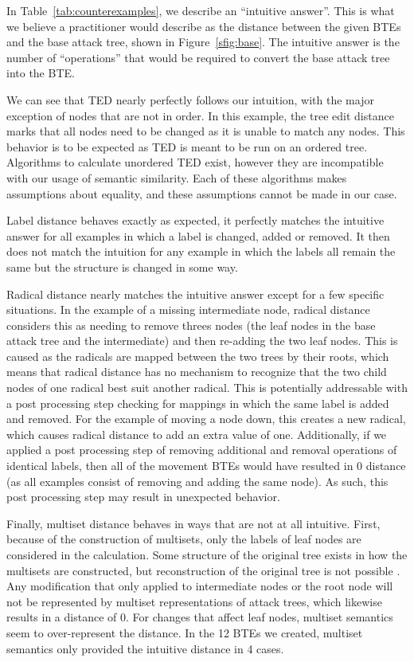 In Table~\ref{tab:counterexamples}, we describe an ``intuitive answer''. This is what we believe a practitioner would describe as the distance between the given BTEs and the base attack tree, shown in Figure~\ref{sfig:base}. The intuitive answer is the number of ``operations'' that would be required to convert the base attack tree into the BTE.

We can see that TED nearly perfectly follows our intuition, with the major exception of nodes that are not in order. In this example, the tree edit distance marks that all nodes need to be changed as it is unable to match any nodes. This behavior is to be expected as TED is meant to be run on an ordered tree. Algorithms to calculate unordered TED exist, however they are incompatible with our usage of semantic similarity. Each of these algorithms makes assumptions about equality, and these assumptions cannot be made in our case.

Label distance behaves exactly as expected, it perfectly matches the intuitive answer for all examples in which a label is changed, added or removed. It then does not match the intuition for any example in which the labels all remain the same but the structure is changed in some way.

Radical distance nearly matches the intuitive answer except for a few specific situations. In the example of a missing intermediate node, radical distance considers this as needing to remove threes nodes (the leaf nodes in the base attack tree and the intermediate) and then re-adding the two leaf nodes. This is caused as the radicals are mapped between the two trees by their roots, which means that radical distance has no mechanism to recognize that the two child nodes of one radical best suit another radical. This is potentially addressable with a post processing step checking for mappings in which the same label is added and removed. For the example of moving a node down, this creates a new radical, which causes radical distance to add an extra value of one. Additionally, if we applied a post processing step of removing additional and removal operations of identical labels, then all of the movement BTEs would have resulted in 0 distance (as all examples consist of removing and adding the same node). As such, this post processing step may result in unexpected behavior.

Finally, multiset distance behaves in ways that are not at all intuitive. First, because of the construction of multisets, only the labels of leaf nodes are considered in the calculation. Some structure of the original tree exists in how the multisets are constructed, but reconstruction of the original tree is not possible \cite{mauw_foundations_2006}. Any modification that only applied to intermediate nodes or the root node will not be represented by multiset representations of attack trees, which likewise results in a distance of 0. For changes that affect leaf nodes, multiset semantics seem to over-represent the distance. In the 12 BTEs we created, multiset semantics only provided the intuitive distance in 4 cases.

